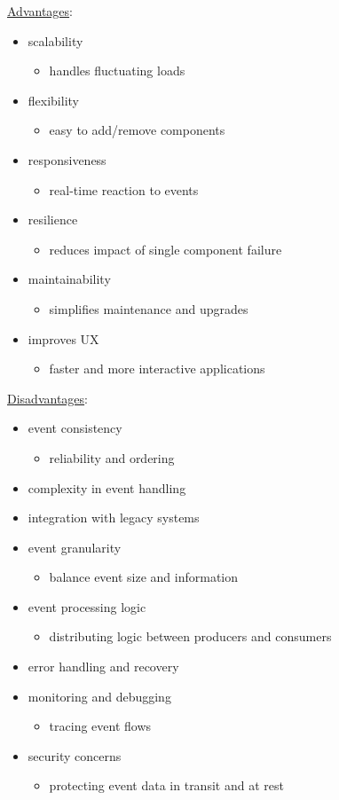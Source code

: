 \documentclass[11pt]{article}
\begin{document}
\uline{Advantages}:
\begin{itemize}
\item scalability
\begin{itemize}
\item handles fluctuating loads
\end{itemize}
\item flexibility
\begin{itemize}
\item easy to add/remove components
\end{itemize}
\item responsiveness
\begin{itemize}
\item real-time reaction to events
\end{itemize}
\item resilience
\begin{itemize}
\item reduces impact of single component failure
\end{itemize}
\item maintainability
\begin{itemize}
\item simplifies maintenance and upgrades
\end{itemize}
\item improves UX
\begin{itemize}
\item faster and more interactive applications
\end{itemize}
\end{itemize}

\uline{Disadvantages}:
\begin{itemize}
\item event consistency
\begin{itemize}
\item reliability and ordering
\end{itemize}
\item complexity in event handling
\item integration with legacy systems
\item event granularity
\begin{itemize}
\item balance event size and information
\end{itemize}
\item event processing logic
\begin{itemize}
\item distributing logic between producers and consumers
\end{itemize}
\item error handling and recovery
\item monitoring and debugging
\begin{itemize}
\item tracing event flows
\end{itemize}
\item security concerns
\begin{itemize}
\item protecting event data in transit and at rest
\end{itemize}
\end{itemize}
\end{document}
